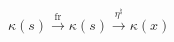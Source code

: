 \(
\kappa(s)\xrightarrow{\ \operatorname{fr}\ }\kappa(s)
\xrightarrow{\ \eta^\natural\ }\kappa(x)
\)

